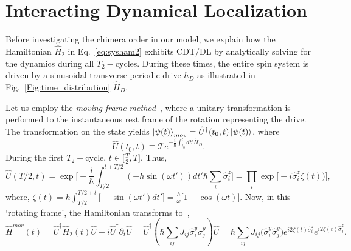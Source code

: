 \documentclass[12pt]{iopart}
\begin{document}
\section{\label{sec:level2} Interacting Dynamical Localization}

Before investigating the chimera order in our model, we explain how the Hamiltonian $\hat{H}_2$ in Eq.~\eqref{eq:sysham2} exhibits CDT/DL by analytically solving for the dynamics during all $T_2-$cycles. During these times,  the entire spin system is driven by a sinusoidal transverse periodic drive \sout{$h_D$ as illustrated in Fig.~\ref{Fig:time_distribution}} $\hat{H}_D$.
	
Let us employ the \textit{moving frame method}~\cite{haldar_dynamical_2021}, where a unitary transformation is performed to the instantaneous rest frame of the rotation representing the drive. The transformation on the state yields $\ket{\psi(t)}_{mov} = \hat{U}^\dagger(t_0,t) \ket{\psi(t)}$, where 
\begin{equation}
    \hat{U}(t_0,t) \equiv \mathcal{T} e^{-\frac{i}{\hbar}\int_{t_0}^{t} dt' \hat{H}_D}.
    \label{eq:rot1}
\end{equation}
During the first $T_2-$cycle, $t \in{\Big[\frac{T}{2}, T \Big]}$. Thus,
\begin{equation}
    \hat{U}\left(T/2,t\right) = \exp \Bigg[-\frac{i}{\hbar}\int_{T/2}^{t+T/2} (-h \sin(\omega t'))dt'\hbar\sum_i\hat{\sigma}^z_i\Bigg]
    = \prod_{i} \exp\Big[-i \hat{\sigma}^z_i\zeta(t))\Big],
\end{equation}
where, $\displaystyle{
    \zeta (t) = h\int_{T/2}^{T/2+t}  \Big[-\sin(\omega t')dt'\Big]=  \frac{h}{\omega}\Big[1-\cos(\omega t)\Big]}$.		
Now, in this `rotating frame', the Hamiltonian transforms to~\cite{haldar_dynamical_2021},
\begin{equation}
    \hat{H}^{mov}(t) = \hat{U}^\dagger \hat{H}_2(t) \hat{U}- i \hat{U}^\dagger \partial_t \hat{U}
    = \hat{U}^\dagger \left(\hbar\sum_{ij}J_{ij}\hat{\sigma}^y_i\hat{\sigma}^y_j\right) \hat{U}
    =\hbar\sum_{ij} J_{ij} \Big(\hat{\sigma}^y_i\hat{\sigma}^y_j\Big) e^{i 2\zeta(t) \hat{\sigma}^z_i}  e^{i 2\zeta(t) \hat{\sigma}^z_j}.
    \label{eq:movham}
\end{equation}
	
\end{document}
